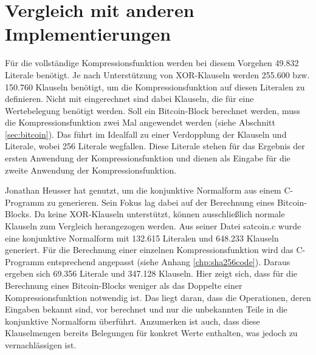 \section{Vergleich mit anderen Implementierungen}

Für die vollständige Kompressionsfunktion werden bei diesem Vorgehen 49.832 Literale benötigt. Je nach Unterstützung von XOR-Klauseln
werden 255.600 bzw. 150.760 Klauseln benötigt, um die Kompressionsfunktion auf diesen Literalen zu definieren. Nicht mit eingerechnet
sind dabei Klauseln, die für eine Wertebelegung benötigt werden. Soll ein Bitcoin-Block berechnet werden, muss die Kompressionsfunktion
zwei Mal angewendet werden (siehe Abschnitt \ref{sec:bitcoin}). Das führt im Idealfall zu einer Verdopplung der Klauseln und Literale,
wobei 256 Literale wegfallen. Diese Literale stehen für das Ergebnis der ersten Anwendung der Kompressionsfunktion und dienen als Eingabe
für die zweite Anwendung der Kompressionsfunktion.

Jonathan Heusser hat  genutzt, um die konjunktive Normalform aus einem C-Programm zu generieren. Sein Fokus lag dabei auf der
Berechnung eines Bitcoin-Blocks. Da  keine XOR-Klauseln unterstützt, können ausschließlich normale Klauseln zum Vergleich
herangezogen werden. Aus seiner Datei satcoin.c \cite{jona:3} wurde eine konjunktive Normalform mit 132.615 Literalen und 648.233 Klauseln
generiert. Für die Berechnung einer einzelnen Kompressionsfunktion wird das C-Programm entsprechend angepasst (siehe Anhang \ref{chp:sha256code}).
Daraus ergeben sich 69.356 Literale und 347.128 Klauseln. Hier zeigt sich, dass  für die Berechnung eines Bitcoin-Blocks weniger
als das Doppelte einer Kompressionsfunktion notwendig ist. Das liegt daran, dass  die Operationen, deren Eingaben bekannt sind,
vor berechnet und nur die unbekannten Teile in die konjunktive Normalform überführt. Anzumerken ist auch, dass diese Klauselmengen bereits
Belegungen für konkret Werte enthalten, was jedoch zu vernachlässigen ist. 

